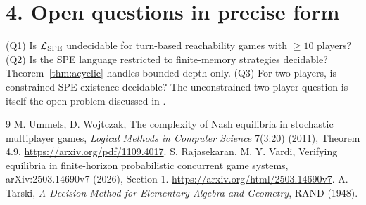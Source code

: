 \documentclass[11pt]{article}
\theoremstyle{definition}
\begin{document}
\section*{4. Open questions in precise form}
(Q1) Is $\mathcal L_{\rm SPE}$ undecidable for turn-based reachability games with $\ge10$ players?
(Q2) Is the SPE language restricted to finite-memory strategies decidable?
Theorem~\ref{thm:acyclic} handles bounded depth only.
(Q3) For two players, is constrained SPE existence decidable? The unconstrained two-player question is itself the
open problem discussed in \cite{rv}.

\begin{thebibliography}{9}
 M. Ummels, D. Wojtczak, The complexity of Nash equilibria in stochastic multiplayer games, \emph{Logical
Methods in Computer Science} 7(3:20) (2011), Theorem 4.9. \url{https://arxiv.org/pdf/1109.4017}.
 S. Rajasekaran, M. Y. Vardi, Verifying equilibria in finite-horizon probabilistic concurrent game systems,
arXiv:2503.14690v7 (2026), Section 1. \url{https://arxiv.org/html/2503.14690v7}.
 A. Tarski, \emph{A Decision Method for Elementary Algebra and Geometry}, RAND (1948).
\end{thebibliography}
\end{document}
